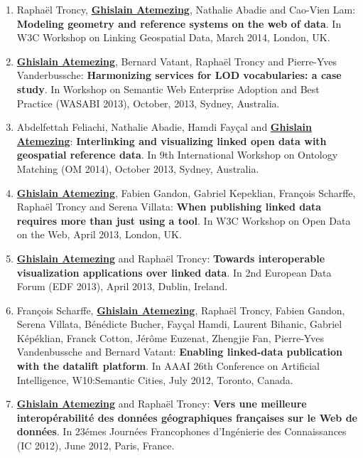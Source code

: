 \begin{enumerate}
 \item Rapha{\"e}l Troncy, \underline{\textbf{Ghislain Atemezing}}, Nathalie Abadie and Cao-Vien Lam: \textbf{Modeling geometry and reference systems on the web of data}. In W3C Workshop on Linking Geospatial Data, March 2014, London, UK.

 \item \underline{\textbf{Ghislain Atemezing}}, Bernard Vatant, Rapha{\"e}l Troncy and Pierre-Yves Vanderbussche: \textbf{Harmonizing services for LOD vocabularies: a case study}. In Workshop on Semantic Web Enterprise Adoption and Best Practice (WASABI 2013), October, 2013, Sydney, Australia.

 \item Abdelfettah Feliachi, Nathalie Abadie, Hamdi Fay\c cal and \underline{\textbf{Ghislain Atemezing}}: \textbf{{I}nterlinking and visualizing linked open data with geospatial reference data}. In 9th International Workshop on Ontology Matching (OM 2014), October 2013, Sydney, Australia.

 \item \underline{\textbf{Ghislain Atemezing}}, Fabien Gandon, Gabriel Kepeklian, Fran\c{c}ois Scharffe, Rapha{\"e}l Troncy and Serena Villata: \textbf{When publishing linked data requires more than just using a tool}. In W3C Workshop on Open Data on the Web, April 2013, London, UK.

 \item \underline{\textbf{Ghislain Atemezing}} and Rapha{\"e}l Troncy: \textbf{Towards interoperable visualization applications over linked data}. In 2nd European Data Forum (EDF 2013), April 2013, Dublin, Ireland.

 \item Fran\c cois Scharffe, \underline{\textbf{Ghislain Atemezing}}, Rapha\"{e}l Troncy, Fabien Gandon, Serena Villata, B\'{e}n\'{e}dicte Bucher, Fay\c cal Hamdi, Laurent Bihanic, Gabriel K\'{e}p\'{e}klian, Franck Cotton, J\'{e}r\^{o}me Euzenat, Zhengjie Fan, Pierre-Yves Vandenbussche and Bernard Vatant: \textbf{Enabling linked-data publication with the datalift platform}. In AAAI 26th Conference on Artificial Intelligence, W10:Semantic Cities, July 2012, Toronto, Canada.

 \item \underline{\textbf{Ghislain Atemezing}} and Rapha\"{e}l Troncy: \textbf{Vers une meilleure interop\'{e}rabilit\'{e} des donn\'{e}es g\'{e}ographiques fran\c caises sur le Web de donn\'{e}es}. In 23\'{e}mes Journ\'{e}es Francophones d'Ing\'{e}nierie des Connaissances (IC 2012), June 2012, Paris, France.


\end{enumerate}
